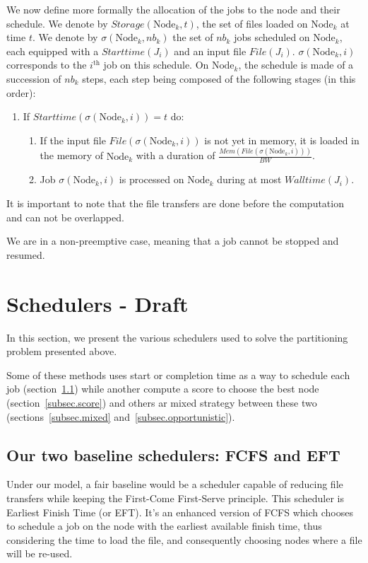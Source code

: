 \documentclass[conference,10pt]{IEEEtran}
\newcommand{\Node}[1]{\ensuremath{\mathrm{Node}_{#1}}\xspace}
\newcommand{\file}{\ensuremath{\mathit{File}}\xspace}
\newcommand{\storage}{\ensuremath{\mathit{Storage}}\xspace}
\newcommand{\memory}{\ensuremath{\mathit{Mem}}\xspace}
\newcommand{\bandwidth}{\mathit{BW}\xspace}
\newcommand{\walltime}{\mathit{Walltime}\xspace}
\newcommand{\start}{\mathit{Starttime}\xspace}
\begin{document}
We now define more formally the allocation of the jobs to the node and
their schedule.
We denote by $\storage(\Node{k}, t)$, the set of files loaded on $\Node{k}$
at time $t$. 
We denote by $\sigma(\Node{k}, \mathit{nb}_k)$ the set of $\mathit{nb}_k$ jobs
scheduled on $\Node{k}$, each equipped with a $\start(J_i)$ and an
input file $\file(J_i)$.
$\sigma(\Node{k}, i)$ corresponds to the $i^\text{th}$ job on this schedule.
On $\Node{k}$, the schedule is made of a
succession of $\mathit{nb}_k$
steps, each step being composed of the
following stages (in this order):
\begin{enumerate}
	\item If $\start(\sigma(\Node{k}, i)) = t$ do:
	\begin{enumerate}
		\item If the input file $\file(\sigma(\Node{k}, i))$ is not yet in memory, it is 
		loaded in the memory of $\Node{k}$ with a duration of $\frac{\memory(\file(\sigma(\Node{k}, i)))}{\bandwidth}$.
		\item Job $\sigma(\Node{k}, i)$ is processed on $\Node{k}$ during at most $\walltime(J_i)$.
	\end{enumerate}
\end{enumerate}
It is important to note that the file transfers are done before the computation and can not be overlapped.

We are in a non-preemptive case, meaning that a job cannot be stopped and resumed.

\section{Schedulers - Draft}\label{sec.schedulers}

In this section, we present the various schedulers used to solve
the partitioning problem presented above. 

Some of these methods uses start or completion time as a way to
schedule each job (section~\ref{subsec.fcfs_eft}) while another compute 
a score to choose the best node (section~\ref{subsec.score}) and others
ar mixed strategy between these two (sections~\ref{subsec.mixed} and~\ref{subsec.opportunistic}).

\subsection{Our two baseline schedulers: FCFS and EFT}\label{subsec.fcfs_eft}

Under our model, a fair baseline would be a scheduler capable
of reducing file transfers while keeping the First-Come First-Serve 
principle. This scheduler is Earliest Finish Time (or EFT).
It's an enhanced version of FCFS which chooses to schedule a job
on the node with the earliest available finish time, thus considering
the time to load the file, and consequently choosing nodes where a file will
be re-used. 
\end{document}
